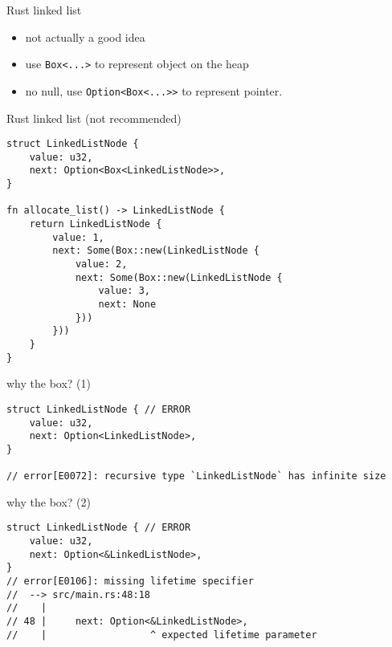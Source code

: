 \begin{frame}[fragile,label=rLL]{Rust linked list}
    \begin{itemize}
    \item not actually a good idea
    \item use \verb|Box<...>| to represent object on the heap
    \item no null, use \verb|Option<Box<...>>| to represent pointer.
    \end{itemize}
\end{frame}

\begin{frame}[fragile,label=rustLL]{Rust linked list (not recommended)}
\begin{verbatim}
struct LinkedListNode {
    value: u32,
    next: Option<Box<LinkedListNode>>,
}

fn allocate_list() -> LinkedListNode {
    return LinkedListNode {
        value: 1,
        next: Some(Box::new(LinkedListNode {
            value: 2,
            next: Some(Box::new(LinkedListNode {
                value: 3,
                next: None
            }))
        }))
    }
}
\end{verbatim}
\end{frame}

\begin{frame}[fragile,label=rustLLNoBox1]{why the box? (1)}
\begin{verbatim}
struct LinkedListNode { // ERROR
    value: u32,
    next: Option<LinkedListNode>,
}

// error[E0072]: recursive type `LinkedListNode` has infinite size
\end{verbatim}
\end{frame}

\begin{frame}[fragile,label=rustLLNoBox2]{why the box? (2)}
\begin{verbatim}
struct LinkedListNode { // ERROR
    value: u32,
    next: Option<&LinkedListNode>,
}
// error[E0106]: missing lifetime specifier
//  --> src/main.rs:48:18
//    |
// 48 |     next: Option<&LinkedListNode>,
//    |                  ^ expected lifetime parameter
\end{verbatim}
\end{frame}
